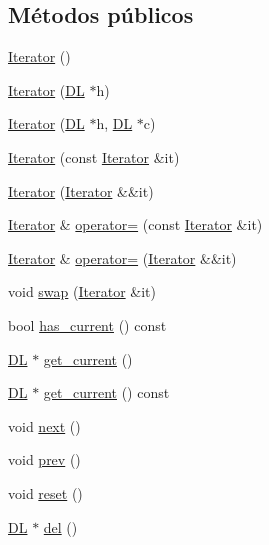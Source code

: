 \subsection*{Métodos públicos}
\begin{DoxyCompactItemize}
\item 
\hyperlink{class_designar_1_1_d_l_1_1_iterator_ac8115296dde1a00604510beba6707b36}{Iterator} ()
\item 
\hyperlink{class_designar_1_1_d_l_1_1_iterator_ab40eab4206926dca72f7981c4920c984}{Iterator} (\hyperlink{class_designar_1_1_d_l}{DL} $\ast$h)
\item 
\hyperlink{class_designar_1_1_d_l_1_1_iterator_aa90c0222a2141efc64f6b70b83137531}{Iterator} (\hyperlink{class_designar_1_1_d_l}{DL} $\ast$h, \hyperlink{class_designar_1_1_d_l}{DL} $\ast$c)
\item 
\hyperlink{class_designar_1_1_d_l_1_1_iterator_a6216eca5f9c0a153ac194a8b7c741636}{Iterator} (const \hyperlink{class_designar_1_1_d_l_1_1_iterator}{Iterator} \&it)
\item 
\hyperlink{class_designar_1_1_d_l_1_1_iterator_ae5d00988114ca7cb890fb5e887c5e3ba}{Iterator} (\hyperlink{class_designar_1_1_d_l_1_1_iterator}{Iterator} \&\&it)
\item 
\hyperlink{class_designar_1_1_d_l_1_1_iterator}{Iterator} \& \hyperlink{class_designar_1_1_d_l_1_1_iterator_a24c29185e86ef76e7ecb17e9abfd42a9}{operator=} (const \hyperlink{class_designar_1_1_d_l_1_1_iterator}{Iterator} \&it)
\item 
\hyperlink{class_designar_1_1_d_l_1_1_iterator}{Iterator} \& \hyperlink{class_designar_1_1_d_l_1_1_iterator_a927bb8ad074ad3021a2d92abfff06fac}{operator=} (\hyperlink{class_designar_1_1_d_l_1_1_iterator}{Iterator} \&\&it)
\item 
void \hyperlink{class_designar_1_1_d_l_1_1_iterator_af8bba1d661f8d6300664481d7c6fd976}{swap} (\hyperlink{class_designar_1_1_d_l_1_1_iterator}{Iterator} \&it)
\item 
bool \hyperlink{class_designar_1_1_d_l_1_1_iterator_a02ccb7a5bbdc828ed8ac923f383661d4}{has\+\_\+current} () const
\item 
\hyperlink{class_designar_1_1_d_l}{DL} $\ast$ \hyperlink{class_designar_1_1_d_l_1_1_iterator_a291e44d1aee5859059aed9754a3dd35a}{get\+\_\+current} ()
\item 
\hyperlink{class_designar_1_1_d_l}{DL} $\ast$ \hyperlink{class_designar_1_1_d_l_1_1_iterator_aab4752b8c8f25cfbbd3560cebf23b7d1}{get\+\_\+current} () const
\item 
void \hyperlink{class_designar_1_1_d_l_1_1_iterator_ade01f6f8d747962c895e95fc0e26c515}{next} ()
\item 
void \hyperlink{class_designar_1_1_d_l_1_1_iterator_a8550a08d7c7645c8ec41ba209ee21893}{prev} ()
\item 
void \hyperlink{class_designar_1_1_d_l_1_1_iterator_a7708230beaa8a47d664878d37c11bbd3}{reset} ()
\item 
\hyperlink{class_designar_1_1_d_l}{DL} $\ast$ \hyperlink{class_designar_1_1_d_l_1_1_iterator_aa21843f313121866b1ad1571c77e65c6}{del} ()
\end{DoxyCompactItemize}
